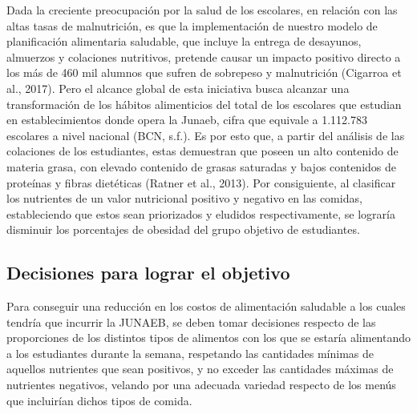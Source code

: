 \documentclass[letterpaper]{article}
\begin{document}
    Dada la creciente preocupación por la salud de los escolares, en relación con las altas tasas de malnutrición, es que la implementación de nuestro modelo de planificación alimentaria saludable, que incluye la entrega de desayunos, almuerzos y colaciones nutritivos, pretende causar un impacto positivo directo a los más de 460 mil alumnos que sufren de sobrepeso y malnutrición (Cigarroa et al., 2017). Pero el alcance global de esta iniciativa busca alcanzar una transformación de los hábitos alimenticios del total de los escolares que estudian en establecimientos donde opera la Junaeb, cifra que equivale a 1.112.783 escolares a nivel nacional (BCN, s.f.). Es por esto que, a partir del análisis de las colaciones de los estudiantes, estas demuestran que poseen un alto contenido de materia grasa, con elevado contenido de grasas saturadas y bajos contenidos de proteínas y fibras dietéticas (Ratner et al., 2013). Por consiguiente, al clasificar los nutrientes de un valor nutricional positivo y negativo en las comidas, estableciendo que estos sean priorizados y eludidos respectivamente, se lograría disminuir los porcentajes de obesidad del grupo objetivo de estudiantes.
    \subsection{Decisiones para lograr el objetivo}
    Para conseguir una reducción en los costos de alimentación saludable a los cuales tendría que incurrir la JUNAEB, se deben tomar decisiones respecto de las proporciones de los distintos tipos de alimentos con los que se estaría alimentando a los estudiantes durante la semana, respetando las cantidades mínimas de aquellos nutrientes que sean positivos, y no exceder las cantidades máximas de nutrientes negativos, velando por una adecuada variedad respecto de los menús que incluirían dichos tipos de comida.  
\end{document}
